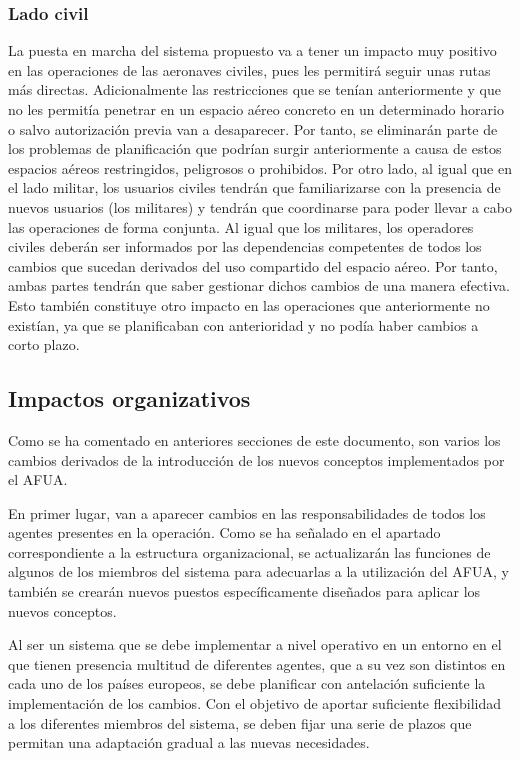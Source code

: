 \subsubsection{Lado civil}

La puesta en marcha del sistema propuesto va a tener un impacto muy positivo en las operaciones de las aeronaves civiles, pues les permitirá seguir unas rutas más directas. Adicionalmente las restricciones que se tenían anteriormente y que no les permitía penetrar en un espacio aéreo concreto en un determinado horario o salvo autorización previa van a desaparecer. Por tanto, se eliminarán parte de los problemas de planificación que podrían surgir anteriormente a causa de estos espacios aéreos restringidos, peligrosos o prohibidos. Por otro lado, al igual que en el lado militar, los usuarios civiles tendrán que familiarizarse con la presencia de nuevos usuarios (los militares) y tendrán que coordinarse para poder llevar a cabo las operaciones de forma conjunta. Al igual que los militares, los operadores civiles deberán ser informados por las dependencias competentes de todos los cambios que sucedan derivados del uso compartido del espacio aéreo. Por tanto, ambas partes tendrán que saber gestionar dichos cambios de una manera efectiva. Esto también constituye otro impacto en las operaciones que anteriormente no existían, ya que se planificaban con anterioridad y no podía haber cambios a corto plazo.

\subsection{Impactos organizativos}

Como se ha comentado en anteriores secciones de este documento, son varios los cambios derivados de la introducción de los nuevos conceptos implementados por el AFUA.

En primer lugar, van a aparecer cambios en las responsabilidades de todos los agentes presentes en la operación. Como se ha señalado en el apartado correspondiente a la estructura organizacional, se actualizarán las funciones de algunos de los miembros del sistema para adecuarlas a la utilización del AFUA, y también se crearán nuevos puestos específicamente diseñados para aplicar los nuevos conceptos.

Al ser un sistema que se debe implementar a nivel operativo en un entorno en el que tienen presencia multitud de diferentes agentes, que a su vez son distintos en cada uno de los países europeos, se debe planificar con antelación suficiente la implementación de los cambios. Con el objetivo de aportar suficiente flexibilidad a los diferentes miembros del sistema, se deben fijar una serie de plazos que permitan una adaptación gradual a las nuevas necesidades.

